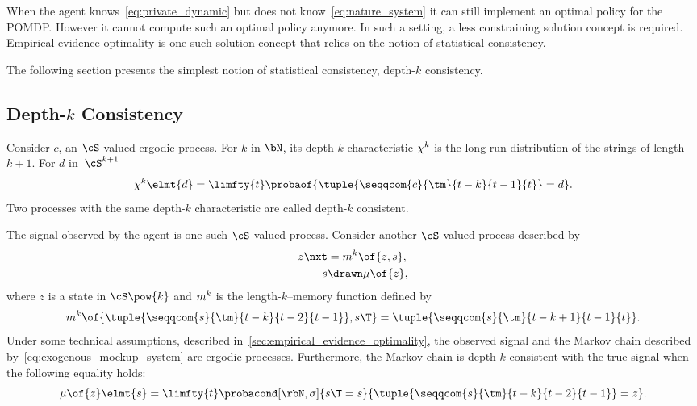 When the agent knows~\cref{eq:private_dynamic} but does not know~\cref{eq:nature_system} it can still implement an optimal policy for the POMDP.
However it cannot compute such an optimal policy anymore.
In such a setting, a less constraining solution concept is required.
Empirical-evidence optimality is one such solution concept that relies on the notion of statistical consistency.

The following section presents the simplest notion of statistical consistency, depth-\(k\) consistency.

\subsection{Depth-\(k\) Consistency}
\label{sec:depth-k_consistency}

Consider \(c\), an \(\cS\)-valued ergodic process.
For \(k\) in \(\bN\), its depth-\(k\) characteristic \(\chi^k\) is the long-run distribution of the strings of length \(k + 1\).
For \(d\) in~\(\cS^{k + 1}\)
\begin{equation}
\label{eq:depth-k_characteristic}
\chi\K\elmt{d} = \limfty{t} \probaof{\tuple{\seqqcom{c}{\tm}{t - k}{t - 1}{t}} = d}.
\end{equation}
Two processes with the same depth-\(k\) characteristic are called depth-\(k\) consistent.

The signal observed by the agent is one such \(\cS\)-valued process.
Consider another \(\cS\)-valued process described by
\begin{subequations}
\label{eq:exogenous_mockup_system}
\begin{align}
\label{eq:exogenous_mockup_model}
z\nxt &= m\K \of{z, s}, \\
\label{eq:exogenous_mockup_predictor}
s &\drawn \mu \of{z},
\end{align}
\end{subequations}
where \(z\) is a state in \(\cS\pow{k}\) and \(m^k\) is the length-\(k\)--memory function defined by
\[
m\K \of{\tuple{\seqqcom{s}{\tm}{t - k}{t - 2}{t - 1}}, s\T} = \tuple{\seqqcom{s}{\tm}{t - k + 1}{t - 1}{t}}.
\]
Under some technical assumptions, described in~\cref{sec:empirical_evidence_optimality}, the observed signal and the Markov chain described by~\cref{eq:exogenous_mockup_system} are ergodic processes.
Furthermore, the Markov chain is depth-\(k\) consistent with the true signal when the following equality holds:
\[
\mu \of{z} \elmt{s} = \limfty{t}\probacond[\rbN, \sigma]{s\T = s}{\tuple{\seqqcom{s}{\tm}{t - k}{t - 2}{t - 1}} = z}.
\]

